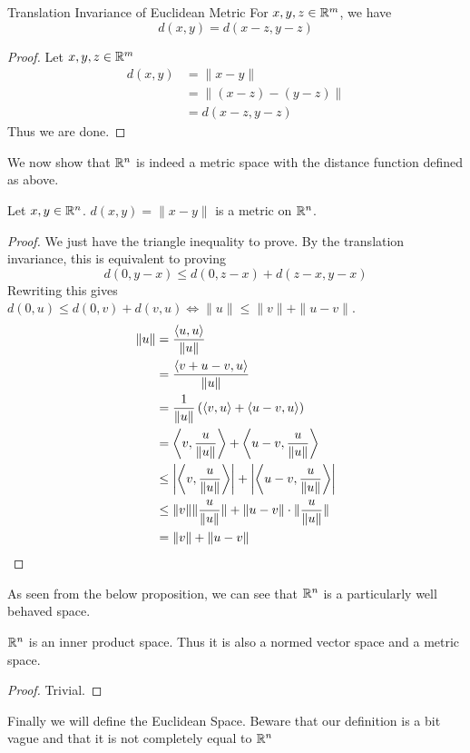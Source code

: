 \documentclass[a4paper]{article}
\begin{document}
\begin{lmm}{Translation Invariance of Euclidean Metric}{} For $x,y,z\in\mathbb{R}^m$, we have $$d(x,y)=d(x-z,y-z)$$ \tcbline
\begin{proof}
Let $x,y,z\in\mathbb{R}^m$
\begin{align*}
d(x,y)&=\|x-y\|\\
&=\|(x-z)-(y-z)\|\\
&=d(x-z,y-z)
\end{align*}
Thus we are done. 
\end{proof}
\end{lmm}

We now show that $\mathbb{R}^n$ is indeed a metric space with the distance function defined as above. 

\begin{thm}{}{} Let $x,y\in\mathbb{R}^n$. $d(x,y)=\|x-y\|$ is a metric on $\mathbb{R}^n$. \tcbline
\begin{proof} We just have the triangle inequality to prove. By the translation invariance, this is equivalent to proving $$d(0,y-x)\leq d(0,z-x)+d(z-x,y-x)$$ Rewriting this gives $d(0,u)\leq d(0,v)+d(v,u)\iff\|u\|\leq\|v\|+\|u-v\|$. 
\begin{align*}
\|u\|&=\frac{\langle u,u\rangle}{\|u\|}\\
&=\frac{\langle v+u-v,u\rangle}{\|u\|}\\
&=\frac{1}{\|u\|}\left(\langle v,u\rangle+\langle u-v,u\rangle\right)\\
&=\left\langle v,\frac{u}{\|u\|}\right\rangle+\left\langle u-v,\frac{u}{\|u\|}\right\rangle\\
&\leq\abs{\left\langle v,\frac{u}{\|u\|}\right\rangle}+\abs{\left\langle u-v,\frac{u}{\|u\|}\right\rangle}\\
&\leq\|v\|\|\frac{u}{\|u\|}\|+\|u-v\|\cdot\|\frac{u}{\|u\|}\|\\
&=\|v\|+\|u-v\|
\end{align*}
\end{proof}
\end{thm}

As seen from the below proposition, we can see that $\mathbb{R}^n$ is a particularly well behaved space. 

\begin{prp}{}{} $\mathbb{R}^n$ is an inner product space. Thus it is also a normed vector space and a metric space. \tcbline
\begin{proof} Trivial. 
\end{proof}
\end{prp}

Finally we will define the Euclidean Space. Beware that our definition is a bit vague and that it is not completely equal to $\mathbb{R}^n$
\end{document}

